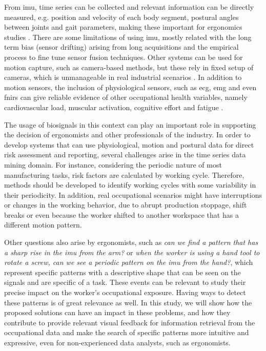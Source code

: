 From \gls{imu}, time series can be collected and relevant information can be directly measured, e.g. position and velocity of each body segment, postural angles between joints and gait parameters, making these important for ergonomics studies \cite{Caputo2019, Hang19}. There are some limitations of using \gls{imu}, mostly related with the long term bias (sensor drifting) arising from long acquisitions and the empirical process to fine tune sensor fusion techniques. Other systems can be used for motion capture, such as camera-based methods, but these rely in fixed setup of cameras, which is unmanageable in real industrial scenarios \cite{sara}. In addition to motion sensors, the inclusion of physiological sensors, such as \gls{ecg}, \gls{emg} and even \gls{fnirs} can give reliable evidence of other occupational health variables, namely cardiovascular load, muscular activation, cognitive effort and fatigue \cite{silva_rip, cardiovascular_load, rythm_cyclic_work, rui_varandas}.

The usage of biosignals in this context can play an important role in supporting the decision of ergonomists and other professionals of the industry. In order to develop systems that can use physiological, motion and postural data for direct risk assessment and reporting, several challenges arise in the time series data mining domain. For instance, considering the periodic nature of most manufacturing tasks, risk factors are calculated by working cycle. Therefore, methods should be developed to identify working cycles with some variability in their periodicity. In addition, real occupational scenarios might have interruptions or changes in the working behavior, due to abrupt production stoppage, shift breaks or even because the worker shifted to another workspace that has a different motion pattern. 

Other questions also arise by ergonomists, such as \textit{can we find a pattern that has a sharp rise in the \gls{imu} from the arm?} or \textit{when the worker is using a hand tool to rotate a screw, can we see a periodic pattern on the \gls{imu} from the hand?}, which represent specific patterns with a descriptive shape that can be seen on the signals and are specific of a task. These events can be relevant to study their precise impact on the worker's occupational exposure. Having ways to detect these patterns is of great relevance as well. In this study, we will show how the proposed solutions can have an impact in these problems, and how they contribute to provide relevant visual feedback for information retrieval from the occupational data and make the search of specific patterns more intuitive and expressive, even for non-experienced data analysts, such as ergonomists.

